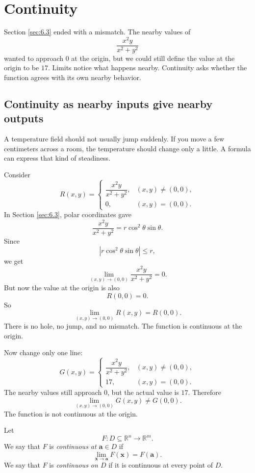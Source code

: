 \section{Continuity}
\label{sec:6.4}

Section \ref{sec:6.3} ended with a mismatch.  The nearby values of
\[
    \frac{x^2y}{x^2+y^2}
\]
wanted to approach \(0\) at the origin, but we could still define the value at the
origin to be \(17\).  Limits notice what happens nearby.  Continuity asks whether the
function agrees with its own nearby behavior.

\subsection{Continuity as nearby inputs give nearby outputs}

A temperature field should not usually jump suddenly.  If you move a few centimeters
across a room, the temperature should change only a little.  A formula can express that
kind of steadiness.

Consider
\[
    R(x,y)=
    \begin{cases}
    \dfrac{x^2y}{x^2+y^2}, & (x,y)\ne(0,0),\\[2mm]
    0, & (x,y)=(0,0).
    \end{cases}
\]
In Section \ref{sec:6.3}, polar coordinates gave
\[
    \frac{x^2y}{x^2+y^2}
    =
    r\cos^2\theta\sin\theta.
\]
Since
\[
    \left|r\cos^2\theta\sin\theta\right|\le r,
\]
we get
\[
    \lim_{(x,y)\to(0,0)}\frac{x^2y}{x^2+y^2}=0.
\]
But now the value at the origin is also
\[
    R(0,0)=0.
\]
So
\[
    \lim_{(x,y)\to(0,0)}R(x,y)=R(0,0).
\]
There is no hole, no jump, and no mismatch.  The function is continuous at the origin.

Now change only one line:
\[
    G(x,y)=
    \begin{cases}
    \dfrac{x^2y}{x^2+y^2}, & (x,y)\ne(0,0),\\[2mm]
    17, & (x,y)=(0,0).
    \end{cases}
\]
The nearby values still approach \(0\), but the actual value is \(17\).  Therefore
\[
    \lim_{(x,y)\to(0,0)}G(x,y)\ne G(0,0).
\]
The function is not continuous at the origin.

\begin{definition}
Let
\[
    F:D\subseteq \mathbb R^n\to\mathbb R^m.
\]
We say that \(F\) is \emph{continuous at \(\mathbf a\in D\)} if
\[
\boxed{
    \lim_{\mathbf x\to\mathbf a}F(\mathbf x)=F(\mathbf a).
}
\]
We say that \(F\) is \emph{continuous on \(D\)} if it is continuous at every point of
\(D\).
\end{definition}

